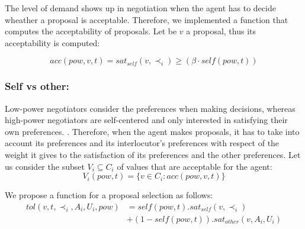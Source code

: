 \documentclass[runningheads,a4paper]{llncs}
\begin{document}
	
	
			
	The level of demand shows up in negotiation when the agent has to decide wheather a proposal is acceptable.
	Therefore, we implemented a function that computes the acceptability of proposals. Let be $v$ a proposal, thus its acceptability is computed:

	\begin{equation}
	acc(pow,v, t) = sat_{self}(v, \prec_i) \geq  (\beta \cdot self(pow,t))
	\end{equation}
	
	
	\subsubsection{Self vs other:} Low-power negotiators consider the preferences when making decisions, whereas high-power negotiators are self-centered and only interested in satisfying their own preferences. \cite{fiske1993controlling,de1995impact}.
	Therefore, when the agent makes proposals, it has to take into account its preferences and its interlocutor's preferences with respect of the weight it gives to the satisfaction of its preferences and the other preferences.	
	Let us consider the subset $V_i\subseteq C_i$ of values that are acceptable for the agent:
	\begin{equation}
	V_i(pow,t) = \{ v\in C_i : acc(pow,v,t) \}
	\end{equation}
	
	We propose a function for a proposal selection as follows:
	\begin{equation}
	\begin{split}
	tol(v, t, \prec_i, A_i, U_i, pow) & = self(pow, t) . sat_{self}(v, \prec_i) \\
	& +  (1 - self(pow, t)) . sat_{other}(v, A_i, U_i)
	\end{split}
	\end{equation}
	
\end{document}
